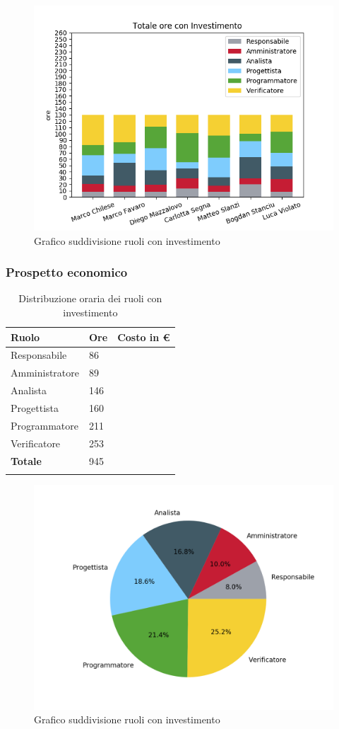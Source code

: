 \begin{figure}[H]
	\centering
  		\includegraphics[width=1\linewidth]{./images/fig_toi.png}
  		\caption{Grafico suddivisione ruoli con investimento}
  		\label{fig:grafico suddivione ruoli con investimento}
\end{figure}

\subsubsection{Prospetto economico}

\begin{longtable}{| C{.30\textwidth}| C{.15\textwidth}| C{.20\textwidth}|}
\hline
\textbf{Ruolo} & \textbf{Ore} & \textbf{Costo in \euro} \\
\hline 
Responsabile & 86 & \\
\hline
Amministratore & 89 &  \\
\hline
Analista & 146 &  \\
\hline 
Progettista & 160 & \\
\hline
Programmatore & 211 &  \\
\hline
Verificatore & 253 &  \\
\hline
\textbf{Totale} & 945 &  \\
\hline
\caption{Distribuzione oraria dei ruoli con investimento}
\label{Distribuzione oraria ruoli con investimento}
\end{longtable}

\begin{figure}[H]
	\centering
  		\includegraphics[width=0.8\linewidth]{./images/torta_toci.png}
  		\caption{Grafico suddivisione ruoli con investimento}
  		\label{fig:grafico suddivione ruoli con investimento}
\end{figure}



